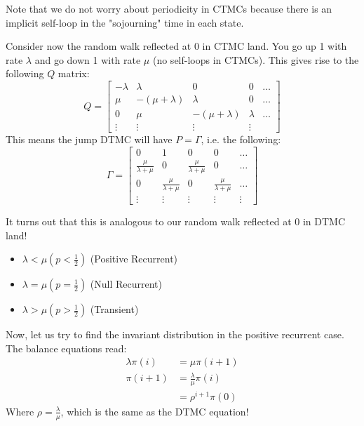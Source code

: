 Note that we do not worry about periodicity in CTMCs because there is an implicit self-loop in the "sojourning" time
in each state.

\begin{example}
    Consider now the random walk reflected at 0 in CTMC land. You go up 1 with rate $\lambda$ and go down 1 with rate $\mu$ (no self-loops in CTMCs). This gives rise to the following
    $Q$ matrix:
    \[ Q = \begin{bmatrix}
        -\lambda & \lambda & 0 & 0 & \dots \\
        \mu & -(\mu + \lambda) & \lambda & 0 & \dots \\
        0 & \mu & -(\mu + \lambda) & \lambda & \dots \\
        \vdots & \vdots & \vdots & \vdots
    \end{bmatrix}\]
    This means the jump DTMC will have $P = \Gamma$, i.e. the following:
    \[ \Gamma = \begin{bmatrix}
        0 & 1 & 0 & 0 & \dots \\
        \frac{\mu}{\lambda + \mu} & 0 & \frac{\mu}{\lambda + \mu} & 0 & \dots \\
        0 & \frac{\mu}{\lambda + \mu} & 0 & \frac{\mu}{\lambda + \mu} & \dots \\
        \vdots & \vdots & \vdots & \vdots & \vdots
    \end{bmatrix} \]

    It turns out that this is analogous to our random walk reflected at 0 in DTMC land!
    \begin{itemize}
        \item $\lambda < \mu (p < \frac{1}{2})$ (Positive Recurrent)
        \item $\lambda = \mu (p = \frac{1}{2})$ (Null Recurrent)
        \item $\lambda > \mu (p > \frac{1}{2})$ (Transient)
    \end{itemize}
    Now, let us try to find the invariant distribution in the positive recurrent case. The balance equations read:
    \begin{align*}
        \lambda \pi(i) &= \mu \pi(i + 1) \\
        \pi(i + 1) &= \frac{\lambda}{\mu} \pi(i) \\
        &= \rho^{i + 1} \pi(0)
    \end{align*}
    Where $\rho = \frac{\lambda}{\mu}$, which is the same as the DTMC equation!
\end{example}
